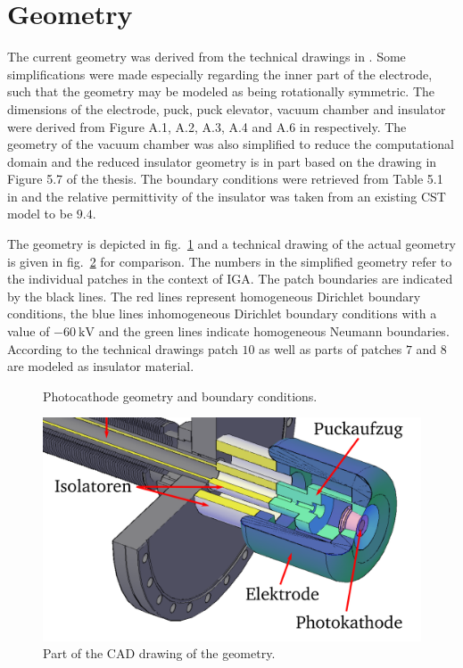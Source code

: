 \section{Geometry}
The current geometry was derived from the technical drawings in \cite{thesis}. Some simplifications were made especially regarding the inner part of the electrode, such that the geometry may be modeled as being rotationally symmetric. The dimensions of the electrode, puck, puck elevator, vacuum chamber and insulator were derived from Figure A.1, A.2, A.3, A.4 and A.6 in \cite{thesis} respectively. The geometry of the vacuum chamber was also simplified to reduce the computational domain and the reduced insulator geometry is in part based on the drawing in Figure 5.7 of the thesis.
The boundary conditions were retrieved from Table 5.1 in \cite{thesis} and the relative permittivity of the insulator was taken from an existing CST model to be $9.4$.

The geometry is depicted in fig.~\ref{fig:geometry} and a technical drawing of the actual geometry is given in fig.~\ref{fig:cad_geometry} for comparison. The numbers in the simplified geometry refer to the individual patches in the context of IGA. The patch boundaries are indicated by the black lines. The red lines represent homogeneous Dirichlet boundary conditions, the blue lines inhomogeneous Dirichlet boundary conditions with a value of $-60\ \mathrm{kV}$ and the green lines indicate homogeneous Neumann boundaries.
According to the technical drawings patch $10$ as well as parts of patches $7$ and $8$ are modeled as insulator material.

\begin{center}
\begin{figure}[H]
  
  \caption{Photocathode geometry and boundary conditions.}
  \label{fig:geometry}
\end{figure}
\end{center}

\begin{center}
\begin{figure}[H]
  \includegraphics[width=\textwidth]{figures/insulator/geometry}
  \caption{Part of the CAD drawing of the geometry.}
  \label{fig:cad_geometry}
\end{figure}
\end{center}

